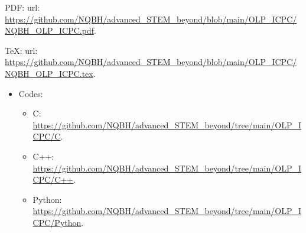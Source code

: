 \documentclass[oneside]{book}
\begin{document}
\begin{enumerate}
	PDF: {\sc url}: \url{https://github.com/NQBH/advanced_STEM_beyond/blob/main/OLP_ICPC/NQBH_OLP_ICPC.pdf}.
	
	\TeX: {\sc url}: \url{https://github.com/NQBH/advanced_STEM_beyond/blob/main/OLP_ICPC/NQBH_OLP_ICPC.tex}.
	\begin{itemize}
		\item Codes:
		\begin{itemize}
			\item C: \url{https://github.com/NQBH/advanced_STEM_beyond/tree/main/OLP_ICPC/C}.
			\item C++: \url{https://github.com/NQBH/advanced_STEM_beyond/tree/main/OLP_ICPC/C++}.
			\item Python: \url{https://github.com/NQBH/advanced_STEM_beyond/tree/main/OLP_ICPC/Python}.
		\end{itemize}
	\end{itemize}
\end{enumerate}


\printbibliography[heading=bibintoc]
	
\end{document}

